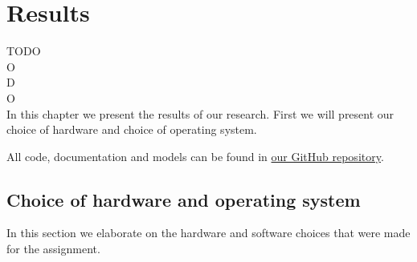 \documentclass[12pt]{scrreprt}
\begin{document}
\chapter{Results}
TODO\\
O\\
D\\
O\\
In this chapter we present the results of our research. First we will present our choice of hardware and choice of operating system.
\par
All code, documentation and models can be found in \href{https://github.com/Yousousen/safety-module-for-care-robot-rose.git}{our GitHub repository}.

\section{Choice of hardware and operating system}
\label{Choice of hardware and software}
In this section we elaborate on the hardware and software choices that were made for the assignment.
\end{document}
